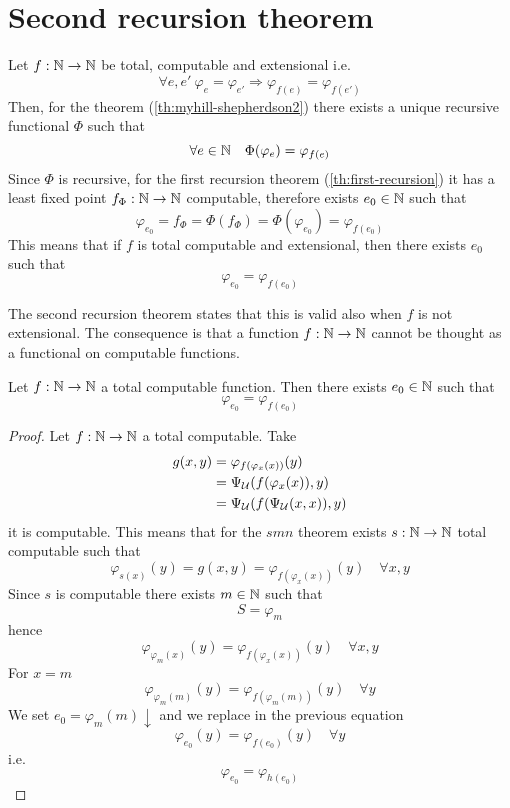 \chapter{Second recursion theorem}
Let $f:\mathbb{N} \to \mathbb{N}$ be total, computable and extensional i.e.
\[
\forall e, e'\ \varphi_e=\varphi_{e'}\Rightarrow\varphi_{f(e)}=\varphi_{f(e')}
\] 
Then, for the
theorem (\ref{th:myhill-shepherdson2}) there exists a unique recursive
functional $\Phi$ such that
\[ \forall e \in \mathbb{N} \quad \Phi(\varphi_e) = \varphi_{f(e)} \] Since $\Phi$ is
recursive, for the first recursion theorem (\ref{th:first-recursion})
it has a least fixed point $f_\Phi :\mathbb{N} \to \mathbb{N}$ computable, therefore exists
$e_0\in \mathbb{N}$ such that
\[
  \varphi_{e_0} = f_\Phi = \Phi(f_\Phi) = \Phi(\varphi_{e_0}) = \varphi_{f(e_0)}
\]
This means that if $f$ is total computable and extensional, then there
exists $e_0$ such that \[\varphi_{e_0} = \varphi_{f(e_0)}\]

The second recursion
theorem states that this is valid also when $f$ is not extensional. The
consequence is that a function $f : \mathbb{N} \to \mathbb{N}$ cannot be thought as a
functional on computable functions.
\begin{theorem}\label{th:second-recursion}
  Let $f : \mathbb{N} \to \mathbb{N}$ a total computable function. Then there exists
  $e_0 \in \mathbb{N}$ such that
  \[
    \varphi_{e_0} = \varphi_{f(e_0)}
  \]
  \begin{proof}
    Let $f : \mathbb{N} \to \mathbb{N}$ a total computable.
    Take
    \begin{align*}
      g(x,y) &= \varphi_{f(\varphi_x(x))}(y)\\
             &= \Psi_{\mathcal{U}}(f(\varphi_x(x)), y)     \\
             &= \Psi_{\mathcal{U}}(f(\Psi_{\mathcal{U}}(x,x)), y) 
    \end{align*}
    it is computable. This means that for the
    $smn$ theorem exists $s : \mathbb{N} \to \mathbb{N}$ total computable such that
    \[
      \varphi_{s(x)}(y) = g(x,y) = \varphi_{f(\varphi_x(x))}(y) \quad \forall x,y
    \]
    Since $s$ is computable there exists $m\in\mathbb{N}$ such that 
    \[
    S = \varphi_m
    \]
    hence
    \[
      \varphi_{\varphi_m(x)}(y) = \varphi_{f(\varphi_x(x))}(y) \quad \forall x,y
    \]
    For $x=m$
    \[
      \varphi_{\varphi_m(m)}(y) = \varphi_{f(\varphi_m(m))}(y) \quad \forall y
    \]
    We set $e_0 = \varphi_m(m)\downarrow$ and we replace in the previous equation
    \[
       \varphi_{e_0}(y) = \varphi_{f(e_0)}(y) \quad \forall y
    \]
    i.e.
    \[
      \varphi_{e_0} = \varphi_{h(e_0)}
    \]
  \end{proof}
\end{theorem}

